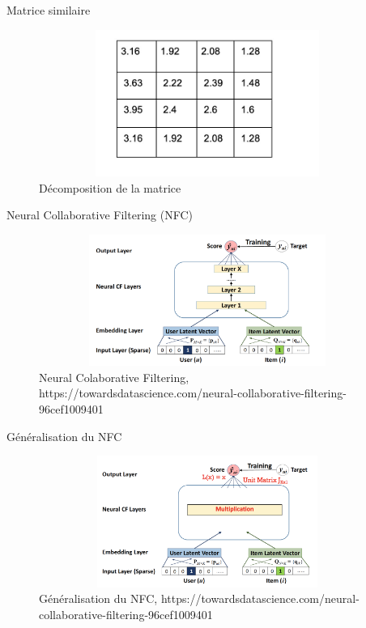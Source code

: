 \documentclass[xelatex,12pt]{beamer}
\begin{document}
\begin{frame}{Matrice similaire}
\begin{figure}[h]
\begin{center}
\includegraphics[width=11cm,height=4.8cm]{images/factorisation_result.jpeg}
\caption[Décomposition de la matrice]{Décomposition de la matrice}
\label{monlabel}
\end{center}
\end{figure}
\end{frame}

\begin{frame}{Neural Collaborative Filtering (NFC)}
\begin{figure}[h]
\begin{center}
\includegraphics[width=11cm,height=4.3cm]{images/neural_cf.png}
\caption[\scriptsize{Neural Colaborative Filtering, https://towardsdatascience.com/neural-collaborative-filtering-96cef1009401}]{\scriptsize{Neural Colaborative Filtering, https://towardsdatascience.com/neural-collaborative-filtering-96cef1009401}}
\label{monlabel}
\end{center}
\end{figure}
\end{frame}

\begin{frame}{Généralisation du NFC}
\begin{figure}[h]
\begin{center}
\includegraphics[width=11cm,height=4.3cm]{images/nfc_multiplication.png}
\caption[\scriptsize{Généralisation du NFC, https://towardsdatascience.com/neural-collaborative-filtering-96cef1009401}]{\scriptsize{Généralisation du NFC, https://towardsdatascience.com/neural-collaborative-filtering-96cef1009401}}
\label{monlabel}
\end{center}
\end{figure}
\end{frame}
\end{document}
